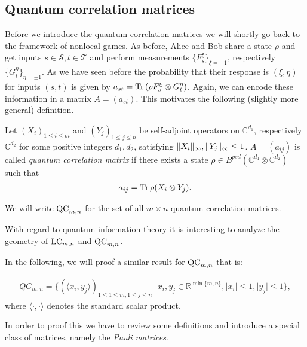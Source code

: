 \subsection{Quantum correlation matrices}
Before we introduce the quantum correlation matrices we will shortly go back to the framework of nonlocal games. As before, Alice and Bob share a state $ \rho $ and get inputs $ s \in \mathcal{S}, t \in \mathcal{T} $ and perform measurements $ \{ F_s^{\xi} \}_{\xi = \pm 1} $, respectively $ \{ G_t^{\eta} \}_{\eta = \pm 1} $.
As we have seen before the probability that their response is $ (\xi,\eta) $ for inputs $ (s,t) $ is given by 
$ a_{st} = \text{Tr} \, {(\rho F_s^\xi \otimes G_t^\eta )}  $. Again, we can encode these information in a matrix $ A=(a_{st}) $. This motivates the following (slightly more general) definition. 
\begin{dfn}
	Let $ (X_i)_{1 \le i \le m } $ and $ (Y_j)_{1 \le j \le n} $ be self-adjoint operators on $ \mathbb{C}^{d_1} $, respectively $ \mathbb{C}^{d_2} $ for some positive integers $ d_1,d_2 $, satisfying $  \Vert {X_i} \Vert_{\infty},  \Vert {Y_j} \Vert_{\infty} \le 1 $. $ A = (a_{ij}) $ is called {\itshape quantum correlation matrix} if there exists a state $ \rho \in B^{psd}(\mathbb{C}^{d_1} \otimes \mathbb{C}^{d_2})$ such that 
	\begin{align}\label{QCaij}
	a_{ij} = \text{Tr} \, {\rho (X_i \otimes Y_j)} .
	\end{align}
\end{dfn}
\noindent We will write $ \textup{QC}_{m,n} $ for the set of all $ m \times n $ quantum correlation matrices.

With regard to quantum information theory it is interesting to analyze the geometry of $ \textup{LC}_{m,n} $ and $ \textup{QC}_{m,n} $. 


In the following, we will proof a similar result for $ \textup{QC}_{m,n} $ that is: 
\begin{lemma}\label{LemQC}
	\begin{align*}\label{EqQC}
		QC_{m,n} = \{ (\langle x_i,y_j \rangle)_{1 \le 1 \le m, 1 \le j \le n} \,| \, x_i,y_j \in \mathbb{R}^{ \min \{m,n \} }, \vert x_i  \vert \le 1, \vert y_j \vert \le 1  \},
	\end{align*}
	where $ \langle \cdot , \cdot \rangle $ denotes the standard scalar product. 
\end{lemma}
In order to proof this we have to review some definitions and introduce a special class of matrices, namely the {\itshape Pauli matrices}.

